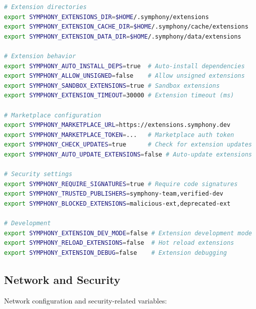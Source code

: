 \begin{lstlisting}[language=bash,caption={Extension System Variables}]
# Extension directories
export SYMPHONY_EXTENSIONS_DIR=$HOME/.symphony/extensions
export SYMPHONY_EXTENSION_CACHE_DIR=$HOME/.symphony/cache/extensions
export SYMPHONY_EXTENSION_DATA_DIR=$HOME/.symphony/data/extensions

# Extension behavior
export SYMPHONY_AUTO_INSTALL_DEPS=true  # Auto-install dependencies
export SYMPHONY_ALLOW_UNSIGNED=false    # Allow unsigned extensions
export SYMPHONY_SANDBOX_EXTENSIONS=true # Sandbox extensions
export SYMPHONY_EXTENSION_TIMEOUT=30000 # Extension timeout (ms)

# Marketplace configuration
export SYMPHONY_MARKETPLACE_URL=https://extensions.symphony.dev
export SYMPHONY_MARKETPLACE_TOKEN=...   # Marketplace auth token
export SYMPHONY_CHECK_UPDATES=true      # Check for extension updates
export SYMPHONY_AUTO_UPDATE_EXTENSIONS=false # Auto-update extensions

# Security settings
export SYMPHONY_REQUIRE_SIGNATURES=true # Require code signatures
export SYMPHONY_TRUSTED_PUBLISHERS=symphony-team,verified-dev
export SYMPHONY_BLOCKED_EXTENSIONS=malicious-ext,deprecated-ext

# Development
export SYMPHONY_EXTENSION_DEV_MODE=false # Extension development mode
export SYMPHONY_RELOAD_EXTENSIONS=false  # Hot reload extensions
export SYMPHONY_EXTENSION_DEBUG=false    # Extension debugging
\end{lstlisting}

\subsection*{Network and Security}

Network configuration and security-related variables:

